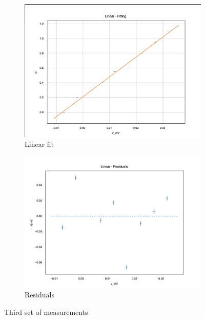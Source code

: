 \documentclass[12pt]{article}
\begin{document}
\begin{figure}[H]
  \centering
  \begin{subfigure}[b]{0.45\textwidth}
    \includegraphics[width=\textwidth]{Electric measurments/Third set fit.png}
    \caption{Linear fit}
    \label{fig:third_set_fit}
  \end{subfigure}\hfill
  \begin{subfigure}[b]{0.45\textwidth}
    \includegraphics[width=\textwidth]{Electric measurments/Third set residual.png}
    \caption{Residuals}
    \label{fig:third_set_residual}
  \end{subfigure}
  \caption{Third set of measurements}
  \label{fig:third_set}
\end{figure}
\end{document}
